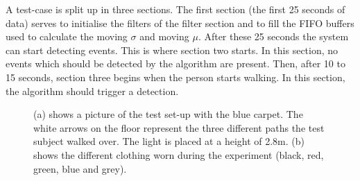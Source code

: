 A test-case is split up in three sections. The first section (the first 25 seconds of data) serves to initialise the filters of the filter section and to fill the FIFO buffers used to calculate the moving $\sigma$ and moving $\mu$. After these 25 seconds the system can start detecting events. This is where section two starts. In this section, no events which should be detected by the algorithm are present. Then, after 10 to 15 seconds, section three begins when the person starts walking. In this section, the algorithm should trigger a detection.

\begin{figure}
	\centering     %
	\caption{(a) shows a picture of the test set-up with the blue carpet. The white arrows on the floor represent the three different paths the test subject walked over. The light is placed at a height of 2.8m. (b) shows the different clothing worn during the experiment (black, red, green, blue and grey).\label{fig:Testsetup}}
\end{figure}

